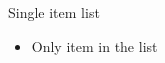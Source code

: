 \documentclass[14pt,t]{beamer}
\begin{document}
\begin{frame}{Single item list}
\begin{itemize}
\item Only item in the list
\end{itemize}
\end{frame}
\end{document}
